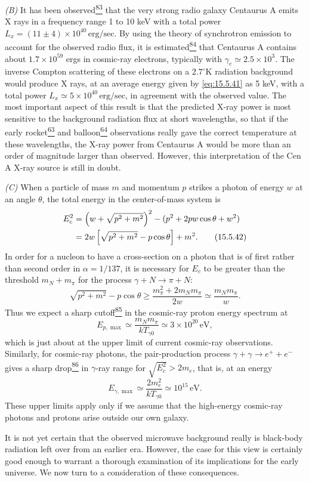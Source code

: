 \emph{(B)} It has been observed\hyperref[ch15-ref-83]{\textsuperscript{83}}
that the very strong radio galaxy Centaurus A emits X rays in a frequency
range 1 to 10 keV with a total power
\(L_x=(11\pm4)\times10^{40}\,\mathrm{erg/sec}\). By using the theory of
synchrotron emission to account for the observed radio flux, it is
estimated\hyperref[ch15-ref-84]{\textsuperscript{84}} that Centaurus A
contains about \(1.7\times10^{59}\) ergs in cosmic-ray electrons, typically
with \(\gamma_e\simeq2.5\times10^3\). The inverse Compton scattering of these
electrons on a \(2.7^\circ\mathrm{K}\) radiation background would produce
X rays, at an average energy given by \eqref{eq:15.5.41} as 5 keV, with a
total power \(L_x\simeq5\times10^{40}\,\mathrm{erg/sec}\), in agreement with
the observed value. The most important aspect of this result is that the
predicted X-ray power is most sensitive to the background radiation flux at
short wavelengths, so that if the early
rocket\hyperref[ch15-ref-63]{\textsuperscript{63}} and
balloon\hyperref[ch15-ref-64]{\textsuperscript{64}} observations really gave
the correct temperature at these wavelengths, the X-ray power from Centaurus A
would be more than an order of magnitude larger than observed. However, this
interpretation of the Cen A X-ray source is still in doubt.

\emph{(C)} When a particle of mass \(m\) and momentum \(p\) strikes a photon
of energy \(w\) at an angle \(\theta\), the total energy in the
center-of-mass system is
\begin{align}
  E_c^2
  &=
  \left(w+\sqrt{p^2+m^2}\right)^2
  -(p^2+2pw\cos\theta+w^2)
  \notag\\
  &=
  2w\left[\sqrt{p^2+m^2}-p\cos\theta\right]+m^2.
  \tag{15.5.42}\label{eq:15.5.42}
\end{align}
In order for a nucleon to have a cross-section on a photon that is of first
rather than second order in \(\alpha=1/137\), it is necessary for \(E_c\) to
be greater than the threshold \(m_N+m_\pi\) for the process
\(\gamma+N\to\pi+N\):
\[
  \sqrt{p^2+m^2}-p\cos\theta
  \geq
  \frac{m_\pi^2+2m_Nm_\pi}{2w}
  \simeq
  \frac{m_Nm_\pi}{w}.
\]
Thus we expect a sharp
cutoff\hyperref[ch15-ref-85]{\textsuperscript{85}} in the cosmic-ray proton
energy spectrum at
\[
  E_{p,\max}
  \simeq
  \frac{m_Nm_\pi}{kT_{\gamma0}}
  \simeq
  3\times10^{20}\,\mathrm{eV},
\]
which is just about at the upper limit of current cosmic-ray observations.
Similarly, for cosmic-ray photons, the pair-production process
\(\gamma+\gamma\to e^++e^-\) gives a sharp
drop\hyperref[ch15-ref-86]{\textsuperscript{86}} in \(\gamma\)-ray range for
\(\sqrt{E_c^2}>2m_e\), that is, at an energy
\[
  E_{\gamma,\max}
  \simeq
  \frac{2m_e^2}{kT_{\gamma0}}
  \simeq
  10^{15}\,\mathrm{eV}.
\]
These upper limits apply only if we assume that the high-energy cosmic-ray
photons and protons arise outside our own galaxy.

It is not yet certain that the observed microwave background really is
black-body radiation left over from an earlier era. However, the case for this
view is certainly good enough to warrant a thorough examination of its
implications for the early universe. We now turn to a consideration of these
consequences.
